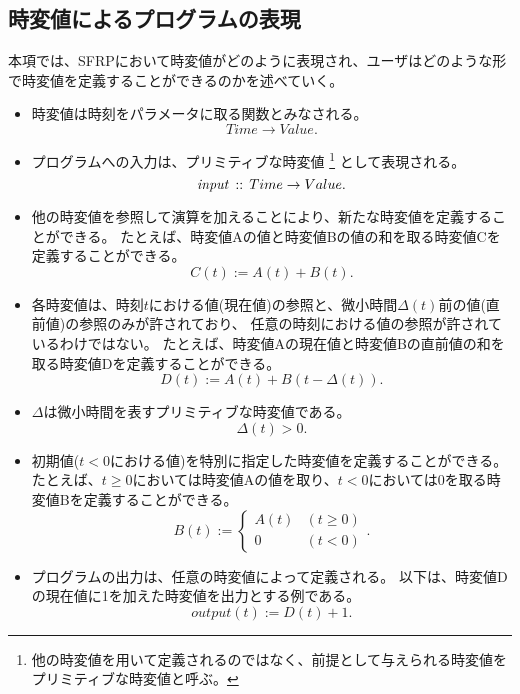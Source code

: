 \subsection{時変値によるプログラムの表現}\label{sec:language:model:program}
本項では、SFRPにおいて時変値がどのように表現され、ユーザはどのような形で時変値を定義することができるのかを述べていく。

\begin{itemize}
  \item
  時変値は時刻をパラメータに取る関数とみなされる。
  \begin{equation*}
    Time \rightarrow Value.
  \end{equation*}

  \item
  プログラムへの入力は、プリミティブな時変値
  \footnote{他の時変値を用いて定義されるのではなく、前提として与えられる時変値をプリミティブな時変値と呼ぶ。}
  として表現される。
  \begin{equation*}
    {\it input} \, :: \, Time \rightarrow Value.
  \end{equation*}

  \item
  他の時変値を参照して演算を加えることにより、新たな時変値を定義することができる。
  たとえば、時変値Aの値と時変値Bの値の和を取る時変値Cを定義することができる。
  \begin{equation*}
    C(t) := A(t) + B(t).
  \end{equation*}

  \item
  各時変値は、時刻$t$における値(現在値)の参照と、微小時間$ \Delta(t) $前の値(直前値)の参照のみが許されており、
  任意の時刻における値の参照が許されているわけではない。
  たとえば、時変値Aの現在値と時変値Bの直前値の和を取る時変値Dを定義することができる。
  \begin{equation*}
    D(t) := A(t) + B(t - \Delta(t)).
  \end{equation*}

  \item
  $ \Delta $は微小時間を表すプリミティブな時変値である。
  \begin{equation*}
    \Delta(t) > 0.
  \end{equation*}

  \item
  初期値($ t < 0 $における値)を特別に指定した時変値を定義することができる。
  たとえば、$t \geq 0$においては時変値Aの値を取り、$t < 0$においては0を取る時変値Bを定義することができる。
  \begin{equation*}
    B(t) := \begin{cases}
      A(t) & (t \geq 0) \\
      0 & (t < 0)
    \end{cases}.
  \end{equation*}

  \item
  プログラムの出力は、任意の時変値によって定義される。
  以下は、時変値Dの現在値に1を加えた時変値を出力とする例である。
  \begin{equation*}
    output(t) := D(t) + 1.
  \end{equation*}
\end{itemize}

